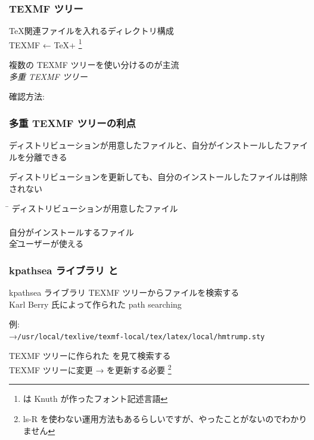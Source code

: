 
\begin{frame}
	\frametitle{TEXMF ツリー}
	\TeX 関連ファイルを入れるディレクトリ構成\\
	{\footnotesize TEXMF ← \TeX + \MF\footnote{\MF は Knuth が作ったフォント記述言語}}
	
	複数の TEXMF ツリーを使い分けるのが主流\\
	\emph{多重 TEXMF ツリー}
	
	確認方法: 
\end{frame}

\begin{frame}
	\frametitle{多重 TEXMF ツリーの利点}
	ディストリビューションが用意したファイルと、自分がインストールしたファイルを分離できる
	
	ディストリビューションを更新しても、自分のインストールしたファイルは削除されない
	
	\begin{tabbing}
	\hspace*{3\zw}\=\kill
	ディストリビューションが用意したファイル\\
		\\
	自分がインストールするファイル\\
		\hspace{1\zw}\={\scriptsize 全ユーザーが使える}\\
	\end{tabbing}
\end{frame}

\begin{frame}
	\frametitle{kpathsea ライブラリ と }
	\begin{block}{kpathsea ライブラリ}
		TEXMF ツリーからファイルを検索する\\
		{\footnotesize Karl Berry 氏によって作られた path searching}
		
		例: \\
		{\scriptsize →\texttt{/usr/local/texlive/texmf-local/tex/latex/local/hmtrump.sty}}
	\end{block}
	
	TEXMF ツリーに作られた  を見て検索する\\
	TEXMF ツリーに変更 →  を更新する必要
	\footnote{ls-R を使わない運用方法もあるらしいですが、やったことがないのでわかりません}\\
\end{frame}

